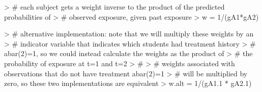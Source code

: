 \documentclass{exam}
\begin{document}
\begin{enumerate}
\begin{solution}
\begin{Schunk}
\begin{Sinput}
> # each subject gets a weight inverse to the product of the predicted probabilities of 
> # observed exposure, given past exposure
> w = 1/(gA1*gA2)
\end{Sinput}
\end{Schunk}
\begin{Schunk}
\begin{Sinput}
> # alternative implementation: note that we will multiply these weights by an 
> # indicator variable that indicates which students had treatment history 
> # abar(2)=1, so we could instead calculate the weights as the product of 
> # the probability of exposure at t=1 and t=2 
> #
> # weights associated with observations that do not have treatment abar(2)=1
> # will be multiplied by zero, so these two implementations are equivalent
> w.alt = 1/(gA1.1 * gA2.1)
\end{Sinput}
\end{Schunk}


\end{solution}
\end{enumerate}
\end{document}
